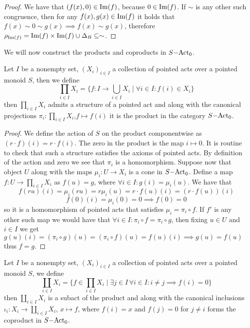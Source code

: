 \begin{proof}
    We have that $(f(x),0)\in\mathrm{Im}(f)$, because $0\in\mathrm{Im}(f)$. If $\sim$ is any other such congruence, then for any $f(x),g(x)\in\mathrm{Im}(f)$
    it holds that $f(x)\sim 0 \sim g(x) \implies f(x)\sim g(x)$, therefore $\rho_{\mathrm{Im}(f)}=\mathrm{Im}(f)\times\mathrm{Im}(f)\cup\Delta_B\subseteq\sim$.
\end{proof}
We will now construct the products and coproducts in $S\mathrm{-Act}_0$. 
\begin{proposition}
    Let $I$ be a nonempty set, $(X_i)_{i\in I}$ a collection of pointed acts over a pointed monoid $S$, then we define 
    \[
        \prod_{i\in I}X_i = \{f: I \to\bigcup_{i\in I } X_i \mid\forall i\in I :  f(i)\in X_i \}
    \]
    then $\prod_{i\in I}X_i$ admits a structure of a pointed act and along with the canonical projections 
    $\pi_i : \prod_{i\in I }X_i$,$f\mapsto f(i)$ it is the product in the category $S\mathrm{-Act}_0$.
\end{proposition}
\begin{proof}
    We define the action of $S$ on the product componentwise as $(r\cdot f)(i) = r\cdot f(i)$. The zero in the product 
    is the map $i\mapsto 0$. It is routine to check that such a structure satisfies the 
    axioms of pointed acts. By definition of the action and zero we see that $\pi_i$ is a homomorphism. Suppose now that 
    object $U$ along with the maps $\mu_i : U \to X_i$ is a cone in $S\mathrm{-Act}_0$. Define a map $f: U \to\prod_{i\in I} X_i$ 
    as $f(u) = g$, where $\forall i\in I : g(i) = \mu_i(u)$. We have that 
    \[
        f(ru)(i) = \mu_i(ru) = r\mu_i(u) = r\cdot f(u)(i) = (r\cdot f(u))(i)
    \]  
    \[
        f(0)(i) = \mu_i(0) = 0 \implies f(0) = 0
    \]
    so it is a homomorphism of pointed acts that satisfies $\mu_i = \pi_i\circ f$. If $f'$ is any other such map we would have that 
    $\forall i\in I : \pi_i\circ f = \pi_i\circ g$, then fixing $u\in U$ and $i\in I$ we get $g(u)(i) = (\pi_i \circ g)(u) = (\pi_i\circ f)(u) = f(u)(i) \implies g(u)=f(u)$ 
    thus $f=g$.
\end{proof}
\begin{proposition}
    Let $I$ be a nonempty set, $(X_i)_{i\in I}$ a collection of pointed acts over a pointed monoid $S$, we define 
    \[
        \coprod_{i\in I } X_i = \{f\in\prod_{i\in I }X_i \mid \exists j\in I\,\forall i\in I : i\neq j \implies f(i) = 0\}
    \]
    then $\coprod_{i\in I} X_i$ is a subact of the product and along with the canonical inclusions $\iota_i : X_i \to \coprod_{i\in I} X_i$, $x\mapsto f$, where 
    $f(i) = x$ and $f(j)=0$ for $j\neq i$
    forms the coproduct in $S\mathrm{-Act}_0$.
\end{proposition}
